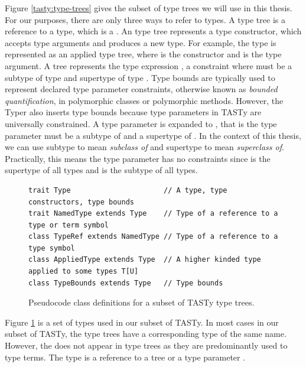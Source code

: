 Figure \ref{tasty:type-trees} gives the subset of type trees we will use in this thesis.
For our purposes, there are only three ways to refer to types.
A  type tree is a reference to a type, which is a .
An  type tree represents a type constructor, which accepts type arguments and produces a new type.
For example, the type  is represented as an applied type tree, where  is the constructor and  is the type argument.
A  tree represents the type expression , a constraint where  must be a subtype of type  and supertype of type .
Type bounds are typically used to represent declared type parameter constraints, otherwise known as \textit{bounded quantification}\cite{systemF:subtyping}, in polymorphic classes or polymorphic methods.
However, the Typer also inserts type bounds because type parameters in TASTy are universally constrained.
A type parameter  is expanded to , that is the type parameter  must be a subtype of  and a supertype of .
In the context of this thesis, we can use subtype to mean \textit{subclass of} and supertype to mean \textit{superclass of}.
Practically, this means the type parameter  has no constraints since  is the supertype of all types and  is the subtype of all types.

\begin{figure}[!htb]
\begin{verbatim}
trait Type                      // A type, type constructors, type bounds
trait NamedType extends Type    // Type of a reference to a type or term symbol
class TypeRef extends NamedType // Type of a reference to a type symbol
class AppliedType extends Type  // A higher kinded type applied to some types T[U]
class TypeBounds extends Type   // Type bounds
\end{verbatim} 
\caption{Pseudocode class definitions for a subset of TASTy type trees.}
\label{tasty:types}
\end{figure}

Figure \ref{tasty:types} is a set of types used in our subset of TASTy.
In most cases in our subset of TASTy, the type trees have a corresponding type of the same name.
However, the  does not appear in type trees as they are predominantly used to type terms.
The  type is a reference to a  tree or a type parameter .

